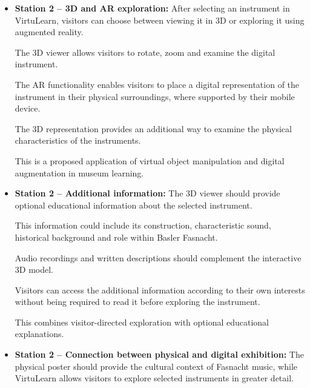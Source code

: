 \begin{itemize}
    Visitors are not required to provide an answer.
    Instead, the activity encourages observation
    and independent exploration.

    This is a proposed adaptation of open-ended
    investigation to the context of musical instruments.
    \cite[pp.~708,~733--734]{franse_families_2021}


    \item \textbf{Station 2 -- 3D and AR exploration:}
    After selecting an instrument in VirtuLearn,
    visitors can choose between viewing it in
    3D or exploring it using augmented reality.

    The 3D viewer allows visitors to rotate,
    zoom and examine the digital instrument.

    The AR functionality enables visitors to
    place a digital representation of the instrument
    in their physical surroundings, where supported
    by their mobile device.

    The 3D representation provides an additional
    way to examine the physical characteristics
    of the instruments.

    This is a proposed application of virtual
    object manipulation and digital augmentation
    in museum learning.
    \cite[pp.~6,~9--10]{zhou_meta-analytic_2022}


    \item \textbf{Station 2 -- Additional information:}
    The 3D viewer should provide optional
    educational information about the selected
    instrument.

    This information could include its construction,
    characteristic sound, historical background
    and role within Basler Fasnacht.

    Audio recordings and written descriptions
    should complement the interactive 3D model.

    Visitors can access the additional information
    according to their own interests without being
    required to read it before exploring the instrument.

    This combines visitor-directed exploration
    with optional educational explanations.
    \cite[pp.~733--734]{franse_families_2021}
    \cite[pp.~6,~9]{zhou_meta-analytic_2022}


    \item \textbf{Station 2 -- Connection between physical
    and digital exhibition:}
    The physical poster should provide the cultural
    context of Fasnacht music, while VirtuLearn
    allows visitors to explore selected instruments
    in greater detail.


\end{itemize}
